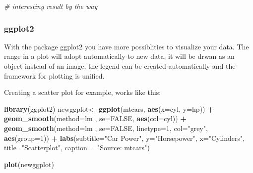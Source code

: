 \documentclass[]{report}
\newenvironment{Shaded}{\begin{snugshade}}{\end{snugshade}}
\newcommand{\KeywordTok}[1]{\textcolor[rgb]{0.13,0.29,0.53}{\textbf{#1}}}
\newcommand{\DataTypeTok}[1]{\textcolor[rgb]{0.13,0.29,0.53}{#1}}
\newcommand{\DecValTok}[1]{\textcolor[rgb]{0.00,0.00,0.81}{#1}}
\newcommand{\StringTok}[1]{\textcolor[rgb]{0.31,0.60,0.02}{#1}}
\newcommand{\CommentTok}[1]{\textcolor[rgb]{0.56,0.35,0.01}{\textit{#1}}}
\newcommand{\OtherTok}[1]{\textcolor[rgb]{0.56,0.35,0.01}{#1}}
\newcommand{\OperatorTok}[1]{\textcolor[rgb]{0.81,0.36,0.00}{\textbf{#1}}}
\newcommand{\NormalTok}[1]{#1}
\begin{document}
\begin{Shaded}
\begin{Highlighting}[]
\CommentTok{# interesting result by the way}
\end{Highlighting}
\end{Shaded}

\subsubsection{ggplot2}\label{ggplot}

With the package ggplot2 you have more possiblities to visualize your
data. The range in a plot will adopt automatically to new data, it will
be drwan as an object instead of an image, the legend can be created
automatically and the framework for plotting is unified.

Creating a scatter plot for example, works like this:

\begin{Shaded}
\begin{Highlighting}[]
\KeywordTok{library}\NormalTok{(ggplot2)}
\NormalTok{newggplot<-}\StringTok{ }\KeywordTok{ggplot}\NormalTok{(mtcars, }\KeywordTok{aes}\NormalTok{(}\DataTypeTok{x=}\NormalTok{cyl, }\DataTypeTok{y=}\NormalTok{hp)) }\OperatorTok{+}\StringTok{ }
\StringTok{         }\KeywordTok{geom_smooth}\NormalTok{(}\DataTypeTok{method=}\NormalTok{lm , }\DataTypeTok{se=}\OtherTok{FALSE}\NormalTok{, }\KeywordTok{aes}\NormalTok{(}\DataTypeTok{col=}\NormalTok{cyl)) }\OperatorTok{+}
\StringTok{         }\KeywordTok{geom_smooth}\NormalTok{(}\DataTypeTok{method=}\NormalTok{lm , }\DataTypeTok{se=}\OtherTok{FALSE}\NormalTok{, }\DataTypeTok{linetype=}\DecValTok{1}\NormalTok{, }\DataTypeTok{col=}\StringTok{"grey"}\NormalTok{, }\KeywordTok{aes}\NormalTok{(}\DataTypeTok{group=}\DecValTok{1}\NormalTok{)) }\OperatorTok{+}\StringTok{ }
\StringTok{  }\KeywordTok{labs}\NormalTok{(}\DataTypeTok{subtitle=}\StringTok{"Car Power"}\NormalTok{, }
       \DataTypeTok{y=}\StringTok{"Horsepower"}\NormalTok{, }
       \DataTypeTok{x=}\StringTok{"Cylinders"}\NormalTok{, }
       \DataTypeTok{title=}\StringTok{"Scatterplot"}\NormalTok{, }
       \DataTypeTok{caption =} \StringTok{"Source: mtcars"}\NormalTok{)}

\KeywordTok{plot}\NormalTok{(newggplot)}
\end{Highlighting}
\end{Shaded}
\end{document}
